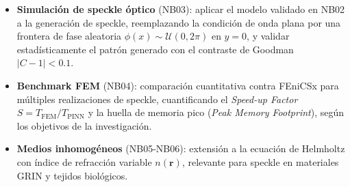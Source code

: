 \begin{itemize}
  \item \textbf{Simulación de speckle óptico} (NB03): aplicar el modelo validado en NB02
    a la generación de speckle, reemplazando la condición de onda plana por una frontera
    de fase aleatoria $\phi(x) \sim \mathcal{U}(0, 2\pi)$ en $y = 0$, y validar
    estadísticamente el patrón generado con el contraste de Goodman $|C - 1| < 0.1$.

  \item \textbf{Benchmark FEM} (NB04): comparación cuantitativa contra FEniCSx para
    múltiples realizaciones de speckle, cuantificando el \textit{Speed-up Factor}
    $S = T_{\mathrm{FEM}} / T_{\mathrm{PINN}}$ \citep{Thuerey2021_PBDL} y la
    huella de memoria pico (\textit{Peak Memory Footprint}), según los objetivos
    de la investigación.

  \item \textbf{Medios inhomogéneos} (NB05-NB06): extensión a la ecuación de Helmholtz
    con índice de refracción variable $n(\mathbf{r})$, relevante para speckle en
    materiales GRIN y tejidos biológicos.
\end{itemize}
